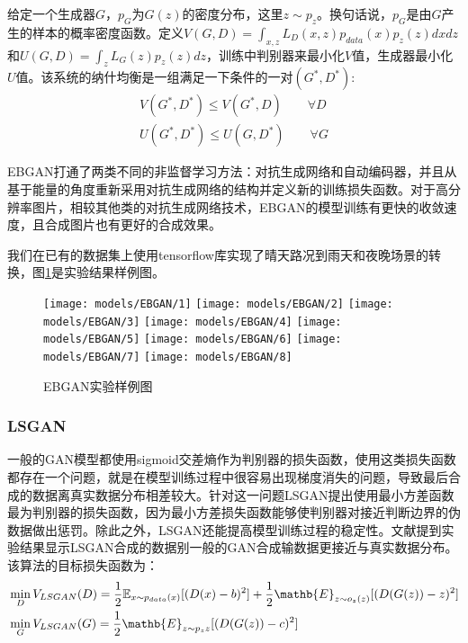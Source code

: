 给定一个生成器$G$，$p_G$为$G(z)$的密度分布，这里$z\sim p_z$。换句话说，$p_G$是由$G$产生的样本的概率密度函数。定义$V(G,D)=\int_{x,z}L_D(x,z)p_{data}(x)p_z(z)dxdz$和$U(G,D)=\int_zL_G(z)p_z(z)dz$，训练中判别器来最小化$V$值，生成器最小化$U$值。该系统的纳什均衡是一组满足一下条件的一对$(G^*,D^*)$:
\begin{equation}
    \begin{aligned}
        V(G^*,D^*) \leq V(G^*,D) \quad\quad \forall D \\
        U(G^*,D^*) \leq U(G,D^*) \quad\quad \forall G 
    \end{aligned}
\end{equation}

EBGAN打通了两类不同的非监督学习方法：对抗生成网络和自动编码器，并且从基于能量的角度重新采用对抗生成网络的结构并定义新的训练损失函数。对于高分辨率图片，相较其他类的对抗生成网络技术，EBGAN的模型训练有更快的收敛速度，且合成图片也有更好的合成效果。

我们在已有的数据集上使用tensorflow库实现了晴天路况到雨天和夜晚场景的转换，图\ref{fig:ebgan}是实验结果样例图。

\begin{figure}[ht]
    \centering
    \texttt{[image: models/EBGAN/1]}
    \texttt{[image: models/EBGAN/2]}
    \texttt{[image: models/EBGAN/3]}
    \texttt{[image: models/EBGAN/4]}
    \texttt{[image: models/EBGAN/5]}
    \texttt{[image: models/EBGAN/6]}
    \texttt{[image: models/EBGAN/7]}
    \texttt{[image: models/EBGAN/8]}
    \caption{EBGAN实验样例图}
    \label{fig:ebgan}
\end{figure}

\subsubsection{LSGAN}

 一般的GAN模型都使用sigmoid交差熵作为判别器的损失函数，使用这类损失函数都存在一个问题，就是在模型训练过程中很容易出现梯度消失的问题，导致最后合成的数据离真实数据分布相差较大。针对这一问题LSGAN提出使用最小方差函数最为判别器的损失函数，因为最小方差损失函数能够使判别器对接近判断边界的伪数据做出惩罚。除此之外，LSGAN还能提高模型训练过程的稳定性。文献\cite{LSGAN}提到实验结果显示LSGAN合成的数据别一般的GAN合成输数据更接近与真实数据分布。该算法的目标损失函数为：
\begin{equation}
\begin{aligned}
    & \min_D V_{LSGAN}(D)=\frac{1}{2}\mathbb{E}_{x\sim p_{data}(x)}[(D(x)-b)^2]+\frac{1}{2}\mathb{E}_{z\sim o_z(z)}[(D(G(z))-z)^2] \\
    & \min_G V_{LSGAN}(G)=\frac{1}{2}\mathb{E}_{z\sim p_z{z}}[(D(G(z))-c)^2]
\end{aligned}
\label{con:f1}
\end{equation}


